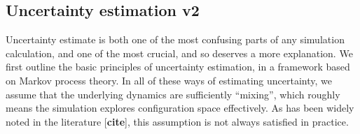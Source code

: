 \documentclass[9pt,bestpractices]{livecoms}
\begin{document}



\subsection{Uncertainty estimation v2}
\label{subsec:uncertainty}

Uncertainty estimate is both one of the most confusing parts of any simulation calculation, and one of the most crucial, and so deserves a more explanation.  We first outline the basic principles of uncertainty estimation, in a framework based on Markov process theory. In all of these ways of estimating uncertainty, we assume that the underlying dynamics are sufficiently ``mixing'', which roughly means the simulation explores configuration space effectively. As has been widely noted in the literature [\textbf{cite}], this assumption is not always satisfied in practice. 
\end{document}
